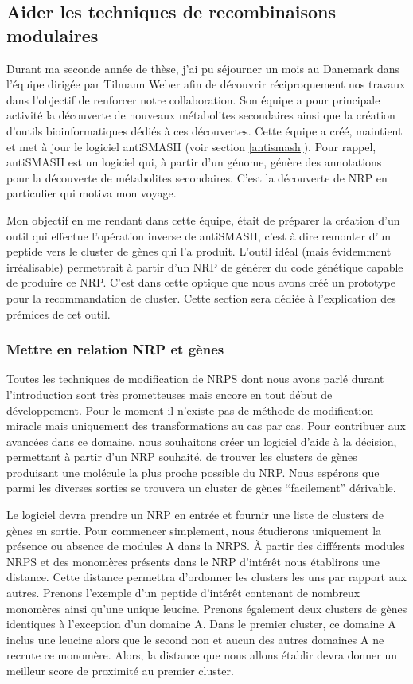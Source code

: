 \subsection{Aider les techniques de recombinaisons modulaires}

Durant ma seconde année de thèse, j'ai pu séjourner un mois au Danemark dans l'équipe dirigée par Tilmann Weber afin de découvrir réciproquement nos travaux dans l'objectif de renforcer notre collaboration.
Son équipe a pour principale activité la découverte de nouveaux métabolites secondaires ainsi que la création d'outils bioinformatiques dédiés à ces découvertes.
Cette équipe a créé, maintient et met à jour le logiciel antiSMASH (voir section \ref{antismash}).
Pour rappel, antiSMASH est un logiciel qui, à partir d'un génome, génère des annotations pour la découverte de métabolites secondaires.
C'est la découverte de NRP en particulier qui motiva mon voyage.

Mon objectif en me rendant dans cette équipe, était de préparer la création d'un outil qui effectue l'opération inverse de antiSMASH, c'est à dire remonter d'un peptide vers le cluster de gènes qui l'a produit.
L'outil idéal (mais évidemment irréalisable) permettrait à partir d'un NRP de générer du code génétique capable de produire ce NRP.
C'est dans cette optique que nous avons créé un prototype pour la recommandation de cluster.
Cette section sera dédiée à l'explication des prémices de cet outil.


\subsubsection{Mettre en relation NRP et gènes}

Toutes les techniques de modification de NRPS dont nous avons parlé durant l'introduction sont très prometteuses mais encore en tout début de développement.
Pour le moment il n'existe pas de méthode de modification miracle mais uniquement des transformations au cas par cas.
Pour contribuer aux avancées dans ce domaine, nous souhaitons créer un logiciel d'aide à la décision, permettant à partir d'un NRP souhaité, de trouver les clusters de gènes produisant une molécule la plus proche possible du NRP.
Nous espérons que parmi les diverses sorties se trouvera un cluster de gènes ``facilement'' dérivable.

Le logiciel devra prendre un NRP en entrée et fournir une liste de clusters de gènes en sortie.
Pour commencer simplement, nous étudierons uniquement la présence ou absence de modules A dans la NRPS.
À partir des différents modules NRPS et des monomères présents dans le NRP d'intérêt nous établirons une distance.
Cette distance permettra d'ordonner les clusters les uns par rapport aux autres.
Prenons l'exemple d'un peptide d'intérêt contenant de nombreux monomères ainsi qu'une unique leucine.
Prenons également deux clusters de gènes identiques à l'exception d'un domaine A.
Dans le premier cluster, ce domaine A inclus une leucine alors que le second non et aucun des autres domaines A ne recrute ce monomère.
Alors, la distance que nous allons établir devra donner un meilleur score de proximité au premier cluster.

